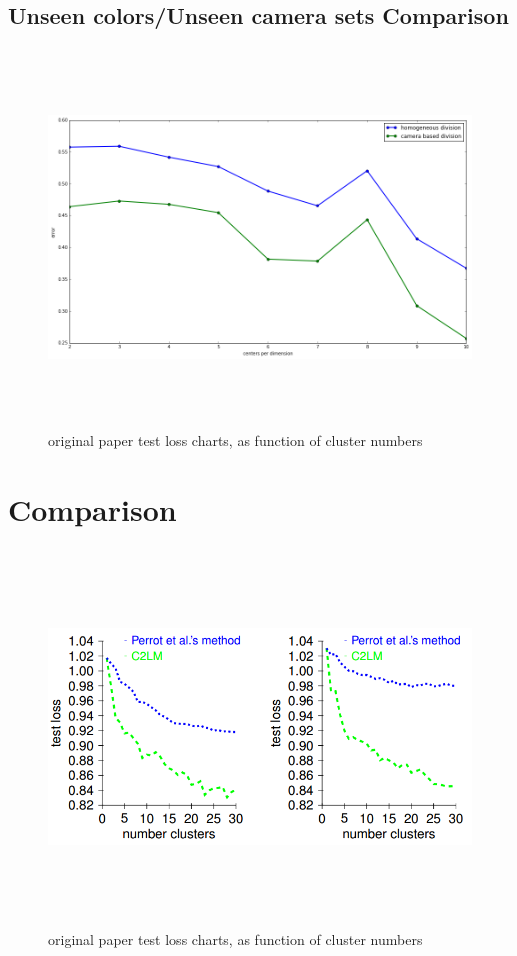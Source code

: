 \subsection{Unseen colors/Unseen camera sets Comparison}

\begin{figure}[H] 
	\includegraphics[width=\linewidth,height=10cm,keepaspectratio]{Figures/color_cam}
	\caption[orig res]
	{original paper test loss charts, as function of cluster numbers}
	\label{original paper results}			
\end{figure}




\section{Comparison}

\begin{figure}[H] 
	\includegraphics[width=\linewidth,height=10cm,keepaspectratio]{Figures/orig_paper_charts}
	\caption[orig res]
	{original paper test loss charts, as function of cluster numbers}
	\label{original paper results}			
\end{figure}


